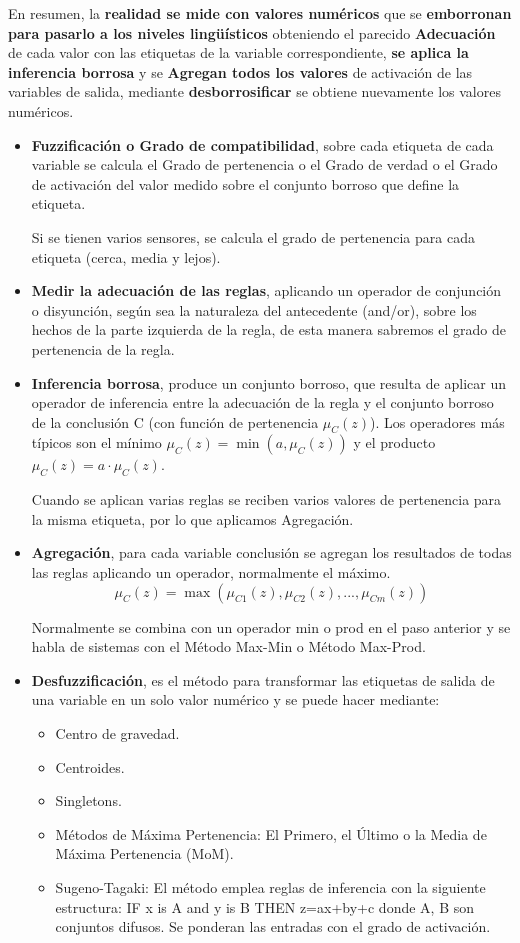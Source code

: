 \documentclass[12pt, twoside, openright]{report} %
\begin{document}
En resumen, la \textbf{realidad se mide con valores numéricos} que se \textbf{emborronan para pasarlo a los niveles lingüísticos} obteniendo el parecido \textbf{Adecuación} de cada valor con las etiquetas de la variable correspondiente, \textbf{se aplica la inferencia borrosa} y se \textbf{Agregan todos los valores} de activación de las variables de salida, mediante \textbf{desborrosificar} se obtiene nuevamente los valores numéricos.
\begin{itemize}
	\item \textbf{Fuzzificación o Grado de compatibilidad}, sobre cada etiqueta de cada variable se calcula el Grado de pertenencia o el Grado de verdad o el Grado de activación del valor medido sobre el conjunto borroso que define la etiqueta. 
	
	Si se tienen varios sensores, se calcula el grado de pertenencia para cada etiqueta (cerca, media y lejos).
	\item \textbf{Medir la adecuación de las reglas}, aplicando un operador de conjunción o disyunción, según sea la naturaleza del antecedente (and/or), sobre los hechos de la parte izquierda de la regla, de esta manera sabremos el grado de pertenencia de la regla.
	\item \textbf{Inferencia borrosa}, produce un conjunto borroso, que resulta de aplicar un operador de inferencia entre la adecuación de la regla y el conjunto borroso de la conclusión C (con función de pertenencia $\mu_C(z)$). Los operadores más típicos son el mínimo $\mu_{C}(z)=\min(a, \mu_{C}(z))$ y el producto $\mu_{C}(z)=a\cdot \mu_{C}(z)$. 
	
	Cuando se aplican varias reglas se reciben varios valores de pertenencia para la misma etiqueta, por lo que aplicamos Agregación.
	\item \textbf{Agregación}, para cada variable conclusión se agregan los resultados de todas las reglas aplicando un operador, normalmente el máximo. $$\mu_{C}(z)=\max(\mu_{C1}(z), \mu_{C2}(z), ..., \mu_{Cm}(z))$$
	
	Normalmente se combina con un operador min o prod en el paso anterior y se habla de sistemas con el Método Max-Min o Método Max-Prod.
	\item \textbf{Desfuzzificación}, es el método para transformar las etiquetas de salida de una variable en un solo valor numérico y se puede hacer mediante:
	\begin{itemize}
		\item Centro de gravedad.
		\item Centroides.
		\item Singletons.
		\item Métodos de Máxima Pertenencia: El Primero, el Último o la Media de Máxima Pertenencia (MoM).
		\item Sugeno-Tagaki: El método emplea reglas de inferencia con la siguiente estructura: IF x is A and y is B THEN z=ax+by+c donde A, B son conjuntos difusos. Se ponderan las entradas con el grado de activación.
	\end{itemize}
\end{itemize}
\end{document}
